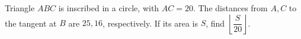 Triangle $ABC$ is inscribed in a circle, with $AC=20$. The distances from $A,C$ to the tangent at $B$ are $25,16$, respectively. If its area is $S$, find $\left\lfloor\dfrac{S}{20}\right\rfloor$.
